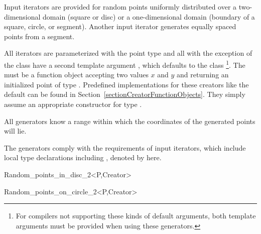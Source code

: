 \ccDefinition

Input iterators are provided for random points uniformly distributed
over a two-dimensional domain (square or disc) or a one-dimensional
domain (boundary of a square, circle, or segment). Another input
iterator generates equally spaced points from a segment.

All iterators are parameterized with the point type  and all
with the exception of the class  have a second
template argument , which defaults to the class
\footnote{%
  For compilers not supporting these kinds of default arguments, both
  template arguments must be provided when using these generators.}.
The  must be a function object accepting two 
values $x$ and $y$ and returning an initialized point  of type
. Predefined implementations for these creators like the
default can be found in Section~\ref{sectionCreatorFunctionObjects}.
They simply assume an appropriate constructor for type .

All generators know a range within which the coordinates of the
generated points will lie.


\ccTypes

The generators comply with the requirements of input iterators, which
include local type declarations including , 
denoted by  here.

\ccCreation
\ccTwo{}{\hspace*{11cm}}

\ccHtmlNoClassFile
\begin{ccClassTemplate}{Random_points_in_disc_2<P,Creator>}
\end{ccClassTemplate}

\ccHtmlNoClassFile
\begin{ccClassTemplate}{Random_points_on_circle_2<P,Creator>}
\end{ccClassTemplate}

